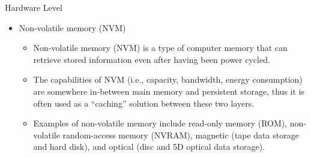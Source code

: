 \documentclass[compress,11pt,xcolor=svgnames,aspectratio=169]{beamer}
\begin{document}
\begin{frame}[fragile]{Hardware Level}

\begin{itemize}

    \item Non-volatile memory (NVM)\\[0.4cm]

    \begin{itemize}
    \setlength\itemsep{0.6cm}

        \item Non-volatile memory (NVM) is a type of computer memory that can retrieve stored information even after having been power cycled.

        \item The capabilities of NVM (i.e., capacity, bandwidth, energy consumption) are somewhere in-between main memory and persistent storage, thus it is often used as a ``caching'' solution between these two layers.

        \item Examples of non-volatile memory include read-only memory (ROM), non-volatile random-access memory (NVRAM), magnetic (tape data storage and hard disk), and optical (disc and 5D optical data storage).

    \end{itemize}

\end{itemize}

\nocite{3372390}

\end{frame}
\end{document}
